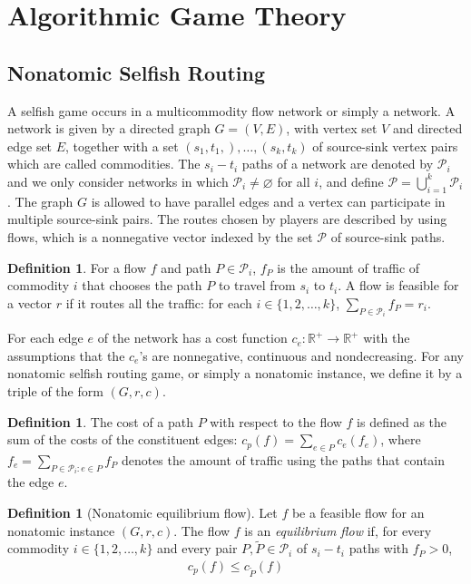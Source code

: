\documentclass[a4paper,10pt]{article}
\theoremstyle{definition}
\newtheorem{defn}[thm]{Definition}
\begin{document}
\section{Algorithmic Game Theory}
\subsection{Nonatomic Selfish Routing}
A selfish game occurs in a multicommodity flow network or simply a network. A network is given by a directed graph $G=(V,E)$, with vertex set $V$ and directed edge set $E$, together with a set $(s_1,t_1,),\ldots, (s_k,t_k)$ of source-sink vertex pairs which are called commodities. The $s_i-t_i$ paths of a network are denoted by $\mathcal{P}_i$ and we only consider networks in which $\mathcal{P}_i \neq \varnothing$ for all $i$, and define $\mathcal{P} = \bigcup_{i=1}^{k}\mathcal{P}_i$. The graph $G$ is allowed to have parallel edges and a vertex can participate in multiple source-sink pairs. The routes chosen by players are described by using flows, which is a nonnegative vector indexed by the set $\mathcal{P}$ of source-sink paths.
\begin{defn}
For a flow $f$ and path $P \in \mathcal{P}_i$, $f_P$ is the amount of traffic of commodity $i$ that chooses the path $P$ to travel from $s_i$ to $t_i$. A flow is feasible for a vector $r$ if it routes all the traffic: for each $i\in \{1, 2, \ldots, k\}$, $\sum_{P\in \mathcal{P}_i}f_P=r_i$.
\end{defn}

For each edge $e$ of the network has a cost function $c_e: \mathbb{R}^+ \to \mathbb{R}^+$ with the assumptions that the $c_e$'s are nonnegative, continuous and nondecreasing. For any nonatomic selfish routing game, or simply a nonatomic instance, we define it by a triple of the form $(G,r,c)$.

\begin{defn}
The cost of a path $P$ with respect to the flow $f$ is defined as the sum of the costs of the constituent edges: $c_p(f)=\sum_{e\in P}c_e(f_e)$, where $f_e=\sum_{P\in \mathcal{P}_i:e \in P}f_P$ denotes the amount of traffic using the paths  that contain the edge $e$.
\end{defn}

\begin{defn}[Nonatomic equilibrium flow]
Let $f$ be a feasible flow for an nonatomic instance $(G,r,c)$. The flow $f$ is an \emph{equilibrium flow} if, for every commodity $i \in \{1,2, \ldots, k\}$ and every pair $P, \tilde{P} \in \mathcal{P}_i$ of $s_i-t_i$ paths with $f_P>0$, 
\begin{align*}
c_p(f) \leq c_{\tilde{P}}(f)
\end{align*}
\end{defn}
\end{document}
